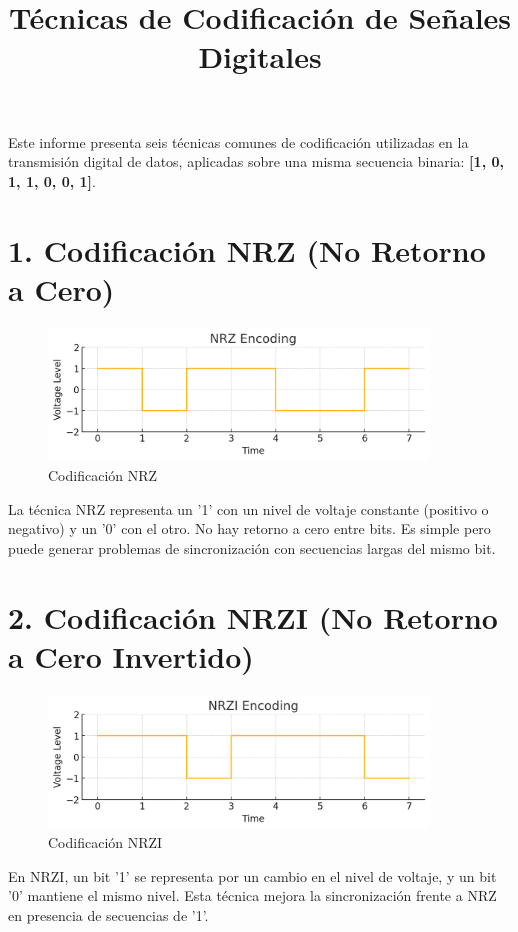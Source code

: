 \documentclass[a4paper,12pt]{article}
\title{Técnicas de Codificación de Señales Digitales}
\author{}
\date{}
\begin{document}
\maketitle

Este informe presenta seis técnicas comunes de codificación utilizadas en la transmisión digital de datos, aplicadas sobre una misma secuencia binaria: \textbf{[1, 0, 1, 1, 0, 0, 1]}.

\section*{1. Codificación NRZ (No Retorno a Cero)}

\begin{figure}[h!]
\centering
\includegraphics[width=0.9\textwidth]{nrz.png}
\caption{Codificación NRZ}
\end{figure}

La técnica NRZ representa un '1' con un nivel de voltaje constante (positivo o negativo) y un '0' con el otro. No hay retorno a cero entre bits. Es simple pero puede generar problemas de sincronización con secuencias largas del mismo bit.


\section*{2. Codificación NRZI (No Retorno a Cero Invertido)}

\begin{figure}[h!]
\centering
\includegraphics[width=0.9\textwidth]{nrzi.png}
\caption{Codificación NRZI}
\end{figure}

En NRZI, un bit '1' se representa por un cambio en el nivel de voltaje, y un bit '0' mantiene el mismo nivel. Esta técnica mejora la sincronización frente a NRZ en presencia de secuencias de '1'.
\end{document}
